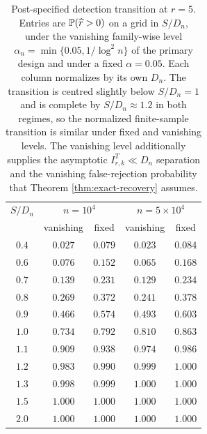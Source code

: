 \begin{table}[H]
\centering
\small
\begin{tabular}{ccccc}
\toprule
$S/D_n$ & \multicolumn{2}{c}{$n=10^4$} & \multicolumn{2}{c}{$n=5{\times}10^4$}\\
 & vanishing & fixed & vanishing & fixed\\
\midrule
$0.4$ & $0.027$ & $0.079$ & $0.023$ & $0.084$\\
$0.6$ & $0.076$ & $0.152$ & $0.065$ & $0.168$\\
$0.7$ & $0.139$ & $0.231$ & $0.129$ & $0.234$\\
$0.8$ & $0.269$ & $0.372$ & $0.241$ & $0.378$\\
$0.9$ & $0.466$ & $0.574$ & $0.493$ & $0.603$\\
$1.0$ & $0.734$ & $0.792$ & $0.810$ & $0.863$\\
$1.1$ & $0.909$ & $0.938$ & $0.974$ & $0.986$\\
$1.2$ & $0.983$ & $0.990$ & $0.999$ & $1.000$\\
$1.3$ & $0.998$ & $0.999$ & $1.000$ & $1.000$\\
$1.5$ & $1.000$ & $1.000$ & $1.000$ & $1.000$\\
$2.0$ & $1.000$ & $1.000$ & $1.000$ & $1.000$\\
\bottomrule
\end{tabular}
\caption{Post-specified detection transition at $r=5$.  Entries are $\mathbb{P}(\widehat r>0)$ on a grid in $S/D_n$, under the vanishing family-wise level $\alpha_n=\min\{0.05,1/\log^2n\}$ of the primary design and under a fixed $\alpha=0.05$.  Each column normalizes by its own $D_n$.  The transition is centred slightly below $S/D_n=1$ and is complete by $S/D_n\approx1.2$ in both regimes, so the normalized finite-sample transition is similar under fixed and vanishing levels.  The vanishing level additionally supplies the asymptotic $I^{T}_{r,k}\ll D_n$ separation and the vanishing false-rejection probability that Theorem \ref{thm:exact-recovery} assumes.}
\label{tab:stress-detection}
\end{table}
